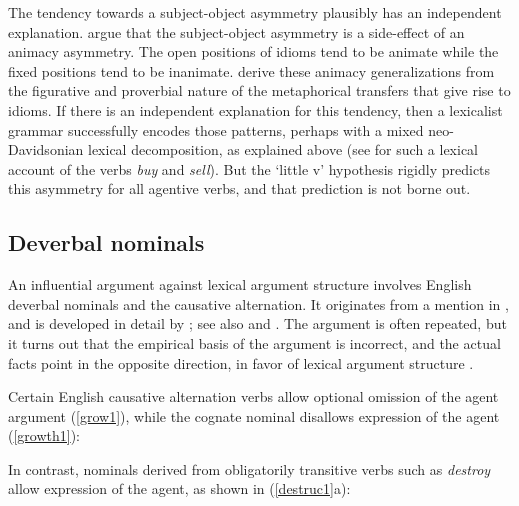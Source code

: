 The tendency towards a subject-object asymmetry plausibly has an independent explanation.
\citet*{NSW94a} argue that the subject-object asymmetry is a side-effect of an animacy asymmetry.
The open positions of idioms tend to be animate while the fixed positions tend to be inanimate.
\citet{NSW94a} derive these animacy generalizations from the figurative and proverbial nature of the
metaphorical transfers that give rise to idioms.  If there is an independent explanation for this
tendency, then a lexicalist grammar successfully encodes those patterns, perhaps with a mixed
neo-Davidsonian lexical decomposition, as explained above (see \citet{Wechsler2005a} for such a
lexical account of the verbs \emph{buy} and \emph{sell}).  But the `little v' hypothesis rigidly
predicts this asymmetry for all agentive verbs, and that prediction is not borne out.

\subsection{Deverbal nominals}
\label{deverbal-sec}

An influential argument against lexical argument structure involves English deverbal nominals and
the causative alternation.  It originates from a mention in \citet{Chomsky70a}, and is developed in
detail by \citet{Marantz97a}; see also \citet{Pesetsky96a-u} and \citet{HN2000a}.  The argument is
often repeated, but it turns out that the empirical basis of the argument is incorrect, and the
actual facts point in the opposite direction, in favor of lexical argument structure
\citep{Wechsler2008b, Wechsler2008a}.

Certain English causative alternation verbs allow optional omission of the agent argument  (\ref{grow1}), while the cognate nominal disallows expression of the agent (\ref{growth1}):

\eal
\label{grow1}
\zl

\eal
\label{growth1}
\zl
%
In contrast, nominals derived from obligatorily transitive verbs such as \emph{destroy} allow expression of the agent, as shown in (\ref{destruc1}a):  

\eal
\label{destroy1}
\zl

\eal
\label{destruc1}
\zl

